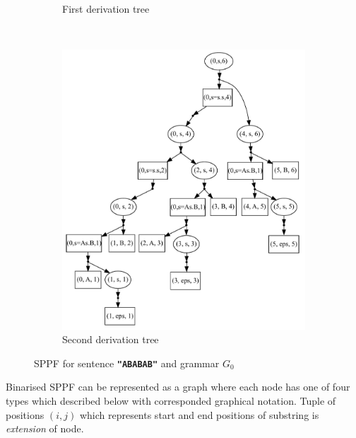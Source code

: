 \begin{figure}[ht]
\begin{center}
\begin{subfigure}[b]{0.3\textwidth}
        \caption{First derivation tree}
        \label{tree1}        
    \end{subfigure}
    ~
    \begin{subfigure}[b]{0.3\textwidth}
        \includegraphics[width=\textwidth]{dot/Brackets2.pdf}
        \caption{Second derivation tree}
        \label{tree2}        
    \end{subfigure}
    \caption{SPPF for sentence \textbf{\texttt{"ABABAB"}} and grammar $G_0$}
    \label{sppfSample}
    \end{center}                
\end{figure}

Binarised SPPF can be represented as a graph where each node has one of four types which described below with corresponded graphical notation.
Tuple of positions $(i,j)$ which represents start and end positions of substring is \textit{extension} of node.

